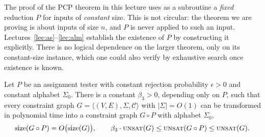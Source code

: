 \begin{remark}\label{rem:no-circularity}
The proof of the PCP theorem in this lecture uses as a subroutine a \emph{fixed} reduction $P$ for inputs of \emph{constant} size.  This is not circular: the theorem we are proving is about inputs of size $n$, and $P$ is never applied to such an input.
Lectures~\ref{lec:as}--\ref{lec:alm} establish the existence of $P$ by constructing it explicitly.  There is no logical dependence on the larger theorem, only on its constant-size instance, which one could also verify by exhaustive search once existence is known.
\end{remark}

\begin{lemma}\label{lem:comp6}
Let $P$ be an assignment tester with constant rejection probability $\epsilon>0$ and constant alphabet $\Sigma_0$.  There is a constant $\beta_3>0$, depending only on $P$, such that every constraint graph $G=\langle(V,E),\Sigma,\mathcal C\rangle$ with $|\Sigma|=O(1)$ can be transformed in polynomial time into a constraint graph $G\circ P$ with alphabet $\Sigma_0$,
\[
  \mathrm{size}(G\circ P)=O\big(\mathrm{size}(G)\big),\qquad
  \beta_3\cdot\textsc{unsat}(G)\le\textsc{unsat}(G\circ P)\le\textsc{unsat}(G).
\]
\end{lemma}
